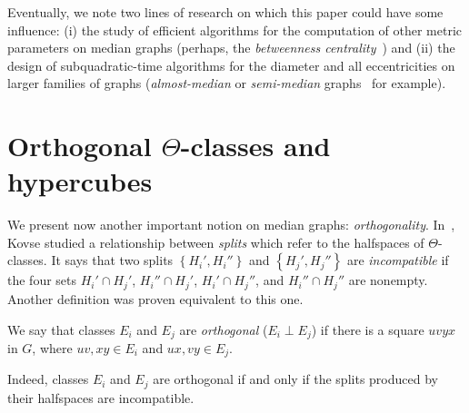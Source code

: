 \documentclass[a4paper,UKenglish,numberwithinsect,cleveref, autoref]{lipics-v2021}
\newcommand{\set}[1]{\left\{ #1 \right\}}
\begin{document}

Eventually, we note two lines of research on which this paper could have some influence: (i) the study of efficient algorithms for the computation of other metric parameters on median graphs (perhaps, the \textit{betweenness centrality}~\cite{AbGrWi15}) and (ii) the design of subquadratic-time algorithms for the diameter and all eccentricities on larger families of graphs (\textit{almost-median} or \textit{semi-median} graphs~\cite{Br07,KlSh12} for example). 

\newpage



\newpage

\appendix

\section{Orthogonal $\Theta$-classes and hypercubes} \label{asec:median}

We present now another important notion on median graphs: \textit{orthogonality}. In~\cite{Ko09}, Kovse studied a relationship between \textit{splits} which refer to the halfspaces of $\Theta$-classes. It says that two splits $\set{H_i',H_i''}$ and $\set{H_j',H_j''}$ are \textit{incompatible} if the four sets $H_i' \cap H_j'$, $H_i'' \cap H_j'$, $H_i' \cap H_j''$, and $H_i'' \cap H_j''$ are nonempty. Another definition was proven equivalent to this one.

\begin{definition}
We say that classes $E_i$ and $E_j$ are {\em orthogonal} ($E_i \perp E_j$) if there is a square $uvyx$ in $G$, where $uv,xy \in E_i$ and $ux,vy \in E_j$.
\end{definition}

Indeed, classes $E_i$ and $E_j$ are orthogonal if and only if the splits produced by their halfspaces are incompatible.
\end{document}
